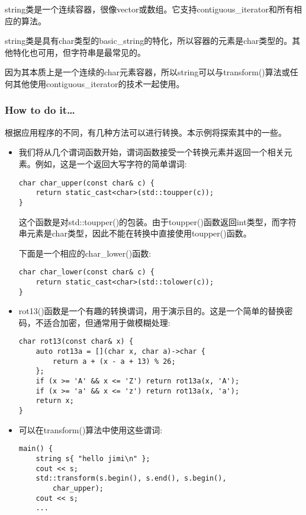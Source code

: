 
string类是一个连续容器，很像vector或数组。它支持contiguous\_iterator和所有相应的算法。

string类是具有char类型的basic\_string的特化，所以容器的元素是char类型的。其他特化也可用，但字符串是最常见的。

因为其本质上是一个连续的char元素容器，所以string可以与transform()算法或任何其他使用contiguous\_iterator的技术一起使用。

\subsubsection{How to do it…}

根据应用程序的不同，有几种方法可以进行转换。本示例将探索其中的一些。

\begin{itemize}
\item 
我们将从几个谓词函数开始，谓词函数接受一个转换元素并返回一个相关元素。例如，这是一个返回大写字符的简单谓词:

\begin{lstlisting}[style=styleCXX]
char char_upper(const char& c) {
	return static_cast<char>(std::toupper(c));
}
\end{lstlisting}

这个函数是对std::toupper()的包装。由于toupper()函数返回int类型，而字符串元素是char类型，因此不能在转换中直接使用toupper()函数。

下面是一个相应的char\_lower()函数:

\begin{lstlisting}[style=styleCXX]
char char_lower(const char& c) {
	return static_cast<char>(std::tolower(c));
}
\end{lstlisting}

\item 
rot13()函数是一个有趣的转换谓词，用于演示目的。这是一个简单的替换密码，不适合加密，但通常用于做模糊处理:

\begin{lstlisting}[style=styleCXX]
char rot13(const char& x) {
	auto rot13a = [](char x, char a)->char {
		return a + (x - a + 13) % 26;
	};
	if (x >= 'A' && x <= 'Z') return rot13a(x, 'A');
	if (x >= 'a' && x <= 'z') return rot13a(x, 'a');
	return x;
}
\end{lstlisting}

\item 
可以在transform()算法中使用这些谓词:

\begin{lstlisting}[style=styleCXX]
main() {
	string s{ "hello jimi\n" };
	cout << s;
	std::transform(s.begin(), s.end(), s.begin(),
		char_upper);
	cout << s;
	...
\end{lstlisting}


\end{itemize}

